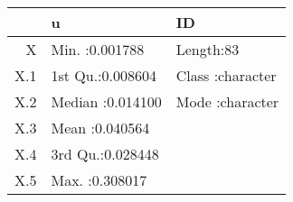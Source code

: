 \begin{table}[ht]
\centering
\begin{tabular}{rll}
  \hline
 &       u &      ID \\ 
  \hline
X & Min.   :0.001788   & Length:83          \\ 
  X.1 & 1st Qu.:0.008604   & Class :character   \\ 
  X.2 & Median :0.014100   & Mode  :character   \\ 
  X.3 & Mean   :0.040564   &  \\ 
  X.4 & 3rd Qu.:0.028448   &  \\ 
  X.5 & Max.   :0.308017   &  \\ 
   \hline
\end{tabular}
\end{table}
